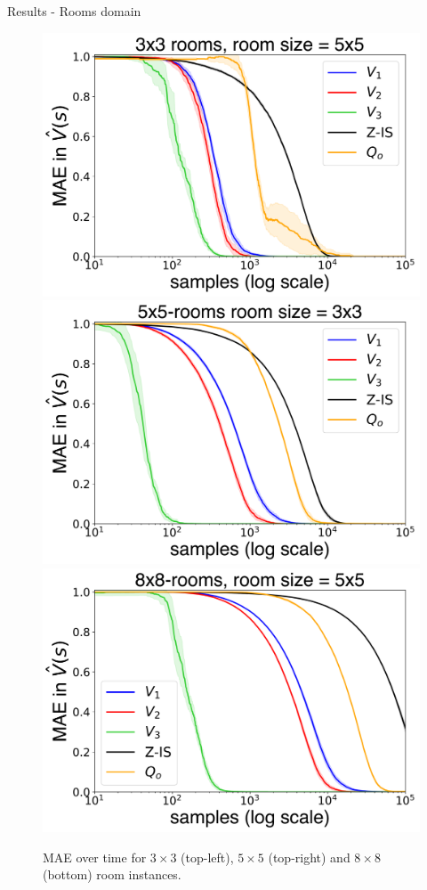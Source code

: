 \documentclass{beamer}
\theoremstyle{mystyle}
\begin{document}
\begin{frame}{Results - Rooms domain}
    \begin{figure}[H]
        \centering
        \includegraphics[scale=0.2]{Figures/nroom_3_3-1.png}
        \includegraphics[scale=0.2]{Figures/nroom_5_5-1.png}
        \includegraphics[scale=0.2]{Figures/nroom_8_8-1.png}

        \caption{MAE over time for $3 \times 3$ (top-left), $5 \times 5$ (top-right) and $8 \times 8$ (bottom) room instances.}
        \label{fig:errors_grid}
    \end{figure}

\end{frame}
\end{document}
